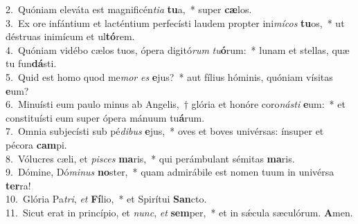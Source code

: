 {2.~}Quóniam eleváta est magnificén\textit{ti}\textit{a} \textbf{tu}a,~* super \textbf{cæ}los.\\
{3.~}Ex ore infántium et lacténtium perfecísti laudem propter ini\textit{mí}\textit{cos} \textbf{tu}os,~* ut déstruas inimícum et ul\textbf{tó}rem.\\
{4.~}Quóniam vidébo cælos tuos, ópera digitó\textit{rum} \textit{tu}\textbf{ó}rum:~* lunam et stellas, quæ tu fun\textbf{dá}sti.\\
{5.~}Quid est homo quod me\textit{mor} \textit{es} \textbf{e}jus?~* aut fílius hóminis, quóniam vísitas \textbf{e}um?\\
{6.~}Minuísti eum paulo minus ab Angelis,~† glória et honóre coro\textit{ná}\textit{sti} \textbf{e}um:~* et constituísti eum super ópera mánuum tu\textbf{á}rum.\\
{7.~}Omnia subjecísti sub pé\textit{di}\textit{bus} \textbf{e}jus,~* oves et boves univérsas: ínsuper et pécora \textbf{cam}pi.\\
{8.~}Vólucres cæli, et \textit{pi}\textit{sces} \textbf{ma}ris,~* qui perámbulant sémitas \textbf{ma}ris.\\
{9.~}Dómine, Dó\textit{mi}\textit{nus} \textbf{no}ster,~* quam admirábile est nomen tuum in univérsa \textbf{ter}ra!\\
{10.~}Glória Pa\textit{tri}, \textit{et} \textbf{Fí}lio,~* et Spirítui \textbf{San}cto.\\
{11.~}Sicut erat in princípio, et \textit{nunc}, \textit{et} \textbf{sem}per,~* et in sǽcula sæculórum. \textbf{A}men.\\
